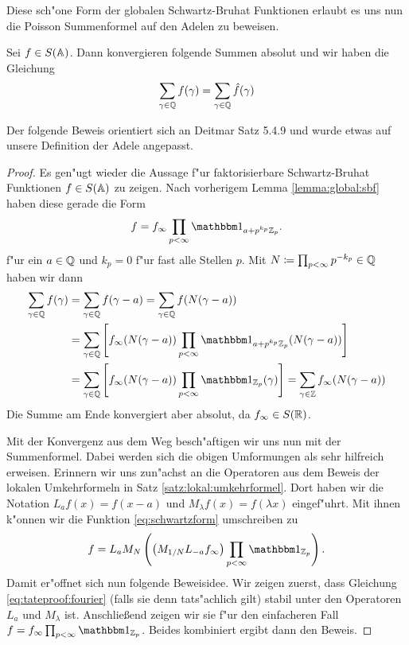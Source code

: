 	Diese sch"one Form der globalen Schwartz-Bruhat Funktionen erlaubt es uns nun die Poisson Summenformel auf den Adelen zu beweisen.
	\begin{satz}
	\label{satz:tateproof:poisson}
		Sei $f \in S(\mathbb{A})$. Dann konvergieren folgende Summen absolut und wir haben die Gleichung
		\begin{align}
			\sum_{\gamma \in \mathbb{Q}} {f(\gamma)} = \sum_{\gamma \in \mathbb{Q}}{\hat{f}(\gamma)} \label{eq:tateproof:fourier}
		\end{align}
	\end{satz}
	Der folgende Beweis orientiert sich an Deitmar \cite{deitmar2010} Satz 5.4.9 und wurde etwas auf unsere Definition der Adele angepasst.
	\begin{proof}
		Es gen"ugt wieder die Aussage f"ur faktorisierbare Schwartz-Bruhat Funktionen $f \in S(\mathbb{A})$ zu zeigen.
		Nach vorherigem Lemma \ref{lemma:global:sbf} haben diese gerade die Form
		\begin{align}
		\label{eq:schwartzform}
			f = f_\infty\prod_{p<\infty} \ind_{a+p^{k_p}\Zp}.
		\end{align}
		f"ur ein $a \in \mathbb{Q}$ und $k_p = 0$ f"ur fast alle Stellen $p$.
		Mit $N\coloneqq \prod_{p<\infty} p^{-k_p} \in \mathbb{Q}$ haben wir dann
		\begin{align*}
			\sum_{\gamma \in \K} {f(\gamma)} 	&= 	\sum_{\gamma \in \K} f(\gamma - a)
												= 	\sum_{\gamma \in \K} f(N(\gamma - a)) \\
												&= 	\sum_{\gamma \in \K} \left[ f_\infty (N(\gamma - a))  \prod_{p< \infty} \ind_{a+p^{k_p}\Zp}(N(\gamma - a)) \right] \\
												&= 	\sum_{\gamma \in \K} \left[ f_\infty (N(\gamma - a))  \prod_{p< \infty} \ind_{\Zp}(\gamma) \right]
												=	\sum_{\gamma \in \Z} f_\infty (N(\gamma - a))
		\end{align*}
		Die Summe am Ende konvergiert aber absolut, da $f_\infty \in S(\mathbb{R})$.
		
		Mit der Konvergenz aus dem Weg besch"aftigen wir uns nun mit der Summenformel.
		Dabei werden sich die obigen Umformungen als sehr hilfreich erweisen.
		Erinnern wir uns zun"achst an die Operatoren aus dem Beweis der lokalen Umkehrformeln in Satz \ref{satz:lokal:umkehrformel}.
		Dort haben wir die Notation $L_a f(x) = f(x-a)$ und $M_\lambda f(x) = f(\lambda x)$ eingef"uhrt.
		Mit ihnen k"onnen wir die Funktion \eqref{eq:schwartzform} umschreiben zu
		\begin{align*}
			f = L_a M_{N}\left( \left(M_{1/N} L_{-a} f_\infty\right) \prod_{p<\infty}\ind_{\Zp}\right).
		\end{align*}
		Damit er"offnet sich nun folgende Beweisidee. 
		Wir zeigen zuerst, dass Gleichung \eqref{eq:tateproof:fourier} (falls sie denn tats"achlich gilt) stabil unter den Operatoren $L_a$ und $M_\lambda$ ist.
		Anschließend zeigen wir sie f"ur den einfacheren Fall $f=f_\infty \prod_{p<\infty}\ind_{\Zp}$.
		Beides kombiniert ergibt dann den Beweis.
		

\end{proof}

